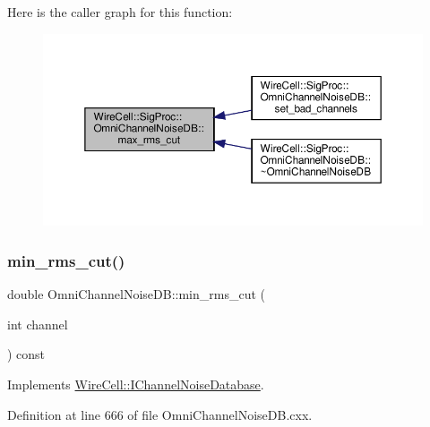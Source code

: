 Here is the caller graph for this function\+:
\nopagebreak
\begin{figure}[H]
\begin{center}
\leavevmode
\includegraphics[width=350pt]{class_wire_cell_1_1_sig_proc_1_1_omni_channel_noise_d_b_a494d0e48066357d8e86ea7ce4d462bdb_icgraph}
\end{center}
\end{figure}
\mbox{\label{class_wire_cell_1_1_sig_proc_1_1_omni_channel_noise_d_b_a37f1dda111792a36315f977c2ade5783}} 
\subsubsection{\texorpdfstring{min\+\_\+rms\+\_\+cut()}{min\_rms\_cut()}}
{\footnotesize\ttfamily double Omni\+Channel\+Noise\+D\+B\+::min\+\_\+rms\+\_\+cut (\begin{DoxyParamCaption}\item[{int}]{channel }\end{DoxyParamCaption}) const\hspace{0.3cm}{\ttfamily [virtual]}}



Implements \hyperlink{class_wire_cell_1_1_i_channel_noise_database_ad0e7e7c3424260af2bd426e578ad83f6}{Wire\+Cell\+::\+I\+Channel\+Noise\+Database}.



Definition at line 666 of file Omni\+Channel\+Noise\+D\+B.\+cxx.

